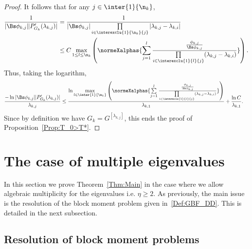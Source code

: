 \begin{proof}
It follows that for any $j \in \inter{1}{\n_k}$,
\begin{align*}
\frac{1}{ | \Bs\phi_{k,j} | | P_{G_k}'(\lambda_{k,j}) | } &= \frac{1}{ | \Bs \phi_{k,j} | \prod\limits_{i\in \interexclu{1}{\n_k}{j}}|\lambda_{k,j}-\lambda_{k,i} | }
\\
&\leq C \max\limits_{1 \leq l \leq \n_k} \left(\normeXalphas{ \sum\limits_{j=1}^{l} \frac{ \frac{\phi_{k,j}}{\Bs \phi_{k,j}}}{\prod\limits_{i\in \interexclu{1}{l}{j} } (\lambda_{k,j}-\lambda_{k,i})} } \right).
\end{align*}
Thus, taking the logarithm,
\begin{align*}
\frac{-\ln | \Bs \phi_{k,j} | | P_{G_k}'(\lambda_{k,j}) |}{\lambda_{k,j}} &\leq \frac{\ln \max\limits_{l\in \inter{1}{\n_k} } \left(\normeXalphas{ \sum\limits_{j=1}^{l} \frac{ \frac{\phi_{k,j}}{\Bs \phi_{k,j}}}{\prod\limits_{i\in \interexclu{1}{l}{j}} (\lambda_{k,j}-\lambda_{k,i})} } \right)}{\lambda_{k,1}} + \frac{\ln C}{\lambda_{k,1}}.
\end{align*}
Since by definition we have $G_k=G^{[\lambda_{k,j}]}$, this ends the proof of Proposition~\ref{Prop:T_0>T*}.
\end{proof}



\section{The case of multiple eigenvalues}\label{Sec:ValPropresMultiples}

In this section we prove Theorem~\ref{Thm:Main} in the case where we allow algebraic multiplicity for the eigenvalues i.e. $\eta \geq 2$. As previously, the main issue is the resolution of the block moment problem given in~\eqref{Def:GBF_DD}. This is detailed in the next subsection.



\subsection{Resolution of block moment problems}

